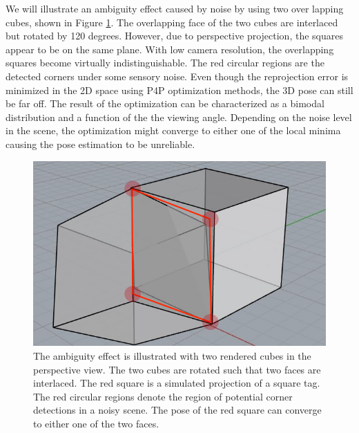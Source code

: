 We will illustrate an ambiguity effect caused by noise by using two over lapping cubes, shown in Figure \ref{fig:cube}. The overlapping face of the two cubes are interlaced but rotated by 120 degrees. However, due to perspective projection, the squares appear to be on the same plane. With low camera resolution, the overlapping squares become virtually indistinguishable. The red circular regions are the detected corners under some sensory noise. Even though the reprojection error is minimized in the 2D space using P4P optimization methods, the 3D pose can still be far off. The result of the optimization can be characterized as a bimodal distribution and a function of the the viewing angle. Depending on the noise level in the scene, the optimization might converge to either one of the local minima causing the pose estimation to be unreliable.

\begin{figure}
\centering
\includegraphics[width=\columnwidth]{figs/perspective_fig}
\caption{The ambiguity effect is illustrated with two rendered cubes in the perspective view. The two cubes are rotated such that two faces are interlaced. The red square is a simulated projection of a square tag. The red circular regions denote the region of potential corner detections in a noisy scene. The pose of the red square can converge to either one of the two faces.}
\label{fig:cube}
\end{figure}